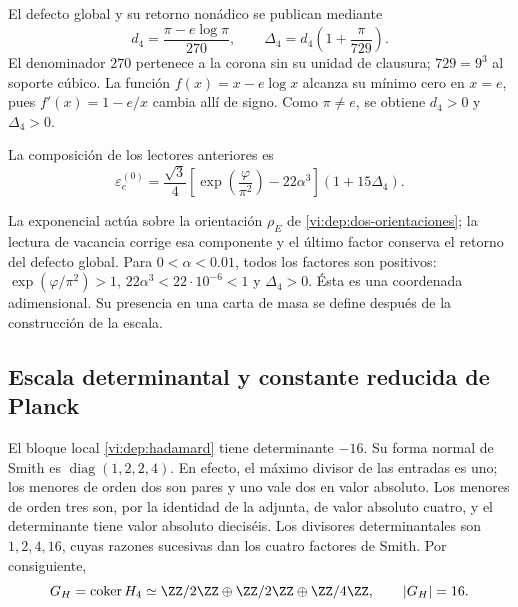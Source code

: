 El defecto global y su retorno nonádico se publican mediante
\begin{equation}
 d_4=\frac{\pi-e\log\pi}{270},\qquad
 \Delta_4=d_4\left(1+\frac{\pi}{729}\right).
 \label{vi:dep:delta4}
\end{equation}
El denominador \(270\) pertenece a la corona sin su unidad de
clausura; \(729=9^3\) al soporte cúbico. La función
\(f(x)=x-e\log x\) alcanza su mínimo cero en \(x=e\), pues
\(f'(x)=1-e/x\) cambia allí de signo. Como \(\pi\ne e\),
se obtiene \(d_4>0\) y \(\Delta_4>0\).

\begin{definition}
\label{vi:dep:electron-basal}
La composición de los lectores anteriores es
\begin{equation}
 \varepsilon_e^{(0)}=
 \frac{\sqrt3}{4}
 \left[\exp\left(\frac{\varphi}{\pi^2}\right)-22\alpha^3\right]
 (1+15\Delta_4).
 \label{vi:dep:formula-basal}
\end{equation}
\end{definition}
La exponencial actúa sobre la orientación \(\rho_E\) de
\eqref{vi:dep:dos-orientaciones}; la lectura de vacancia corrige esa
componente y el último factor conserva el retorno del defecto global.
Para \(0<\alpha<0.01\), todos los factores son positivos:
\(\exp(\varphi/\pi^2)>1\), \(22\alpha^3<22\cdot10^{-6}<1\)
y \(\Delta_4>0\). Ésta es una coordenada adimensional. Su presencia
en una carta de masa se define después de la construcción de la escala.

\subsection{Escala determinantal y constante reducida de Planck}
\label{vi:dep:planck}

El bloque local \eqref{vi:dep:hadamard} tiene determinante \(-16\).
Su forma normal de Smith es \(\operatorname{diag}(1,2,2,4)\).
En efecto, el máximo divisor de las entradas es uno; los menores de
orden dos son pares y uno vale dos en valor absoluto. Los menores de
orden tres son, por la identidad de la adjunta, de valor absoluto cuatro,
y el determinante tiene valor absoluto dieciséis. Los divisores
determinantales son \(1,2,4,16\), cuyas razones sucesivas dan los
cuatro factores de Smith. Por consiguiente,
\begin{equation}
 G_H=\operatorname{coker}H_4
 \simeq\ZZ/2\ZZ\oplus\ZZ/2\ZZ\oplus\ZZ/4\ZZ,
 \qquad |G_H|=16.
 \label{vi:dep:conucleo}
\end{equation}

